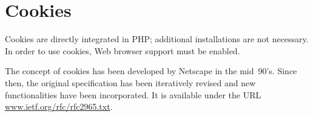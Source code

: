 \documentclass[a4paper, justified, notoc]{tufte-handout} %
\begin{document}
\section{Cookies} %
\label{sec:cookies}
Cookies are directly integrated in PHP; additional installations are not necessary. 
In order to use cookies, Web browser support must be enabled.

The concept of cookies has been developed by Netscape in the mid~90's. Since then, the original specification has been iteratively revised and new functionalities have been incorporated. It is available under the URL \url{www.ietf.org/rfc/rfc2965.txt}.
\end{document}
